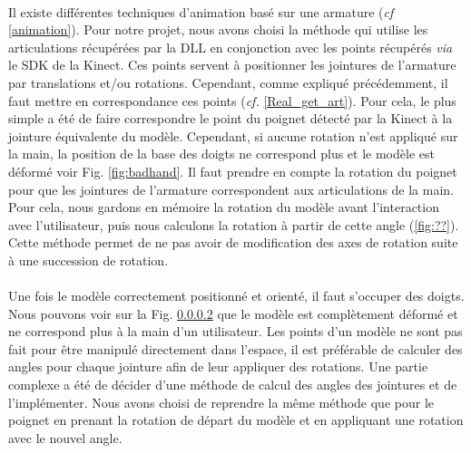 \paragraph{} 
Il existe différentes techniques d'animation basé sur une armature (\textit{cf} \ref{animation}).
Pour notre projet, nous avons choisi la méthode qui utilise les articulations récupérées par la DLL en conjonction avec les points récupérés \textit{via} le SDK de la Kinect. Ces points servent à positionner les jointures de l'armature par translations et/ou rotations.
Cependant, comme expliqué précédemment, il faut mettre en correspondance ces points (\textit{cf.} \ref{Real_get_art}).
Pour cela, le plus simple a été de faire correspondre le point du poignet détecté par la Kinect à la jointure équivalente du modèle.
Cependant, si aucune rotation n'est appliqué sur la main, la position de la base des doigts ne correspond plus et le modèle est déformé voir Fig. \ref{fig:badhand}.
Il faut prendre en compte la rotation du poignet pour que les jointures de l'armature correspondent aux articulations de la main. 
Pour cela, nous gardons en mémoire la rotation du modèle avant l'interaction avec l'utilisateur,
puis nous calculons la rotation à partir de cette angle (\ref{fig:??}). Cette méthode permet de ne pas avoir de modification des axes de rotation suite à une succession de rotation.

%
\paragraph{} 
Une fois le modèle correctement positionné et orienté, il faut s'occuper des doigts.
Nous pouvons voir sur la Fig. \ref{} que le modèle est complètement déformé et ne correspond plus à la main d'un utilisateur. Les points d'un modèle
ne sont pas fait pour être manipulé directement dans l'espace, il est préférable de calculer des angles pour chaque jointure afin de leur appliquer 
des rotations. Une partie complexe a été de décider d'une méthode de calcul des angles des jointures et de l'implémenter.
Nous avons choisi de reprendre la même méthode que pour le poignet en prenant la rotation de départ du modèle et en appliquant une rotation avec le nouvel angle.

